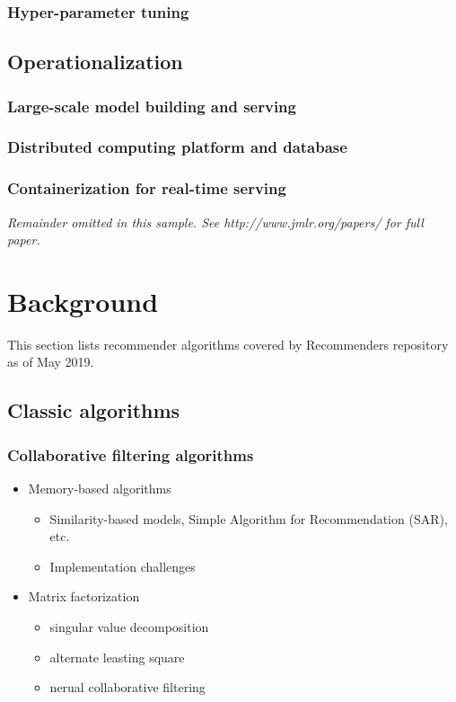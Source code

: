 \documentclass[twoside,11pt]{article}
\begin{document}
\subsubsection{Hyper-parameter tuning}

\subsection{Operationalization}
\subsubsection{Large-scale model building and serving}
\subsubsection{Distributed computing platform and database}
\subsubsection{Containerization for real-time serving}

{\noindent \em Remainder omitted in this sample. See http://www.jmlr.org/papers/ for full paper.}

\section{Background}
This section lists recommender algorithms covered by Recommenders repository as of May 2019.

\subsection{Classic algorithms}
\subsubsection{Collaborative filtering algorithms}
\begin{itemize}
  \item Memory-based algorithms
    \begin{itemize}
      \item Similarity-based models, Simple Algorithm for Recommendation (SAR), etc.
      \item Implementation challenges
    \end{itemize}
  \item Matrix factorization
    \begin{itemize} 
      \item singular value decomposition
      \item alternate leasting square
      \item nerual collaborative filtering
    \end{itemize}
\end{itemize}
\end{document}
